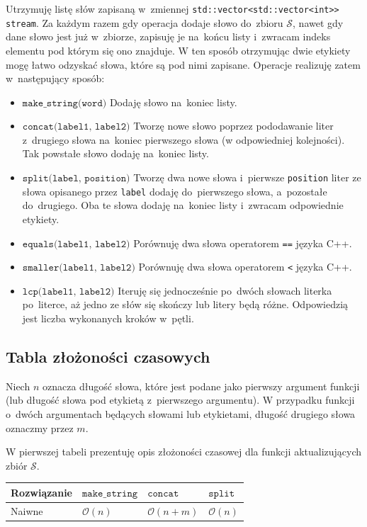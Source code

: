 \documentclass[declaration,shortabstract]{iithesis}
\theoremstyle{definition} \newtheorem{definition}{Definicja}[chapter]
\theoremstyle{remark} \newtheorem{remark}[definition]{Obserwacja}
\theoremstyle{plain} \newtheorem{theorem}[definition]{Twierdzenie}
\theoremstyle{remark} \newtheorem{example}{Przykład}[definition]
\theoremstyle{plain} \newtheorem{lemma}[definition]{Lemat}
\begin{document}
Utrzymuję listę słów zapisaną w~zmiennej \texttt{std::vector<std::vector<int>> stream}. Za każdym razem gdy operacja dodaje słowo do~zbioru $\mathcal{S}$, nawet gdy dane słowo jest już w~zbiorze, zapisuję je na~końcu listy i~zwracam indeks elementu pod którym się ono znajduje. W ten sposób otrzymując dwie etykiety mogę łatwo odzyskać słowa, które są pod nimi zapisane. Operacje realizuję zatem w~następujący sposób:
\begin{itemize}
    \item $\texttt{make\_string(word)}$ Dodaję słowo na~koniec listy.
    \item $\texttt{concat(label1, label2)}$ Tworzę nowe słowo poprzez pododawanie liter z~drugiego słowa na~koniec pierwszego słowa (w odpowiedniej kolejności). Tak powstałe słowo dodaję na~koniec listy. 
    \item $\texttt{split(label, position)}$ Tworzę dwa nowe słowa i~pierwsze \texttt{position} liter ze słowa opisanego przez \texttt{label} dodaję do~pierwszego słowa, a~pozostałe do~drugiego. Oba te słowa dodaję na~koniec listy i~zwracam odpowiednie etykiety.
    \item $\texttt{equals(label1, label2)}$ Porównuję dwa słowa operatorem \texttt{==} języka C++.
    \item $\texttt{smaller(label1, label2)}$ Porównuję dwa słowa operatorem \texttt{<} języka C++.
    \item $\texttt{lcp(label1, label2)}$ Iteruję się jednocześnie po~dwóch słowach literka po~literce, aż jedno ze słów się skończy lub litery będą różne. Odpowiedzią jest liczba wykonanych kroków w~pętli.
\end{itemize}

\subsection{Tabla złożoności czasowych}

Niech $n$ oznacza długość słowa, które jest podane jako pierwszy argument funkcji (lub długość słowa pod etykietą z~pierwszego argumentu). W przypadku funkcji o~dwóch argumentach będących słowami lub etykietami, długość drugiego słowa oznaczmy przez $m$.

W pierwszej tabeli prezentuję opis złożoności czasowej dla funkcji aktualizujących zbiór $\mathcal{S}$.

\begin{center}
    \begin{tabular}{ | m{3cm} | >{\centering\arraybackslash}m{3cm} | >{\centering\arraybackslash}m{3cm} | >{\centering\arraybackslash}m{3cm} | }
        \hline 
        Rozwiązanie & $\texttt{make\_string}$ & $\texttt{concat}$ & $\texttt{split}$ \\
        \hline
        Naiwne & $\mathcal{O}(n)$ & $\mathcal{O}(n + m)$ & $\mathcal{O}(n)$ \\
        \hline
    \end{tabular}
\end{center}
\end{document}

